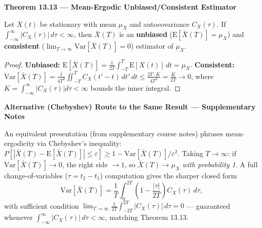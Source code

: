 \documentclass[11pt]{article}
\newcommand{\E}[1]{\mathrm{E}\left[#1\right]}
\newcommand{\Var}[1]{\mathrm{Var}\left[#1\right]}
\renewcommand{\P}[1]{P\left[#1\right]}
\newcommand{\topline}[1]{\par\vspace{5pt}\noindent{\color{#1}\rule{\linewidth}{1.1pt}}\par\vspace{3pt}}
\newcommand{\botline}[1]{\par\vspace{2pt}\noindent{\color{#1}\rule{\linewidth}{1.1pt}}\par\vspace{8pt}}
\newenvironment{thmbox}[2]{%
  \topline{thmcol}\noindent\textbf{\color{thmcol}Theorem #1 --- #2}\par\smallskip\noindent\ignorespaces
}{\botline{thmcol}}
\newenvironment{notebox}[1]{%
  \topline{notecol}\noindent\textbf{\color{notecol}#1}\par\smallskip\noindent\ignorespaces
}{\botline{notecol}}
\begin{document}
\begin{thmbox}{13.13}{Mean-Ergodic Unbiased/Consistent Estimator}
Let $X(t)$ be stationary with mean $\mu_X$ and autocovariance $C_X(\tau)$. If
$\int_{-\infty}^{\infty}|C_X(\tau)|\,d\tau<\infty$, then $\bar X(T)$ is an \textbf{unbiased}
($\E{\bar X(T)}=\mu_X$) and \textbf{consistent} ($\lim_{T\to\infty}\Var{\bar X(T)}=0$) estimator
of $\mu_X$.
\end{thmbox}
\begin{proof}
\textbf{Unbiased:} $\E{\bar X(T)}=\frac{1}{2T}\int_{-T}^{T}\E{X(t)}\,dt=\mu_X$.
\textbf{Consistent:} $\Var{\bar X(T)} = \frac{1}{4T^2}\iint_{-T}^{T} C_X(t'-t)\,dt'\,dt \le
\frac{2T\cdot K}{4T^2}=\frac{K}{2T}\to0$, where $K=\int_{-\infty}^\infty|C_X(\tau)|d\tau<\infty$
bounds the inner integral.
\end{proof}

\begin{notebox}{Alternative (Chebyshev) Route to the Same Result --- Supplementary Notes}
An equivalent presentation (from supplementary course notes) phrases mean-ergodicity via
Chebyshev's inequality: $\P{|\bar X(T)-\E{\bar X(T)}|\le\varepsilon}\ge
1-\Var{\bar X(T)}/\varepsilon^2$. Taking $T\to\infty$: if $\Var{\bar X(T)}\to0$, the right side
$\to1$, so $\bar X(T)\to\mu_X$ \emph{with probability 1}. A full change-of-variables
($\tau=t_2-t_1$) computation gives the sharper closed form
\[ \Var{\bar X(T)} = \frac{1}{T}\int_0^{2T}\left(1-\frac{|\tau|}{2T}\right)C_X(\tau)\,d\tau, \]
with sufficient condition $\displaystyle\lim_{T\to\infty}\frac1{2T}\int_{-2T}^{2T}|C_X(\tau)|\,d\tau=0$
--- guaranteed whenever $\int_{-\infty}^{\infty}|C_X(\tau)|\,d\tau<\infty$, matching Theorem 13.13.
\end{notebox}

\begin{center}
\end{center}
\end{document}
